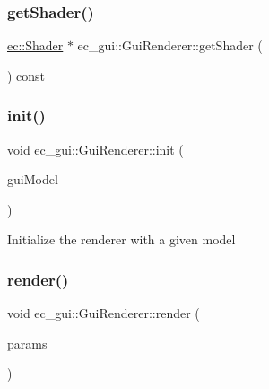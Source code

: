 \subsubsection{\texorpdfstring{get\+Shader()}{getShader()}}
{\footnotesize\ttfamily \mbox{\hyperlink{classec_1_1_shader}{ec\+::\+Shader}} $\ast$ ec\+\_\+gui\+::\+Gui\+Renderer\+::get\+Shader (\begin{DoxyParamCaption}{ }\end{DoxyParamCaption}) const}

\mbox{\label{classec__gui_1_1_gui_renderer_a35e7de4510fa8206976d894868710a99}} 
\subsubsection{\texorpdfstring{init()}{init()}}
{\footnotesize\ttfamily void ec\+\_\+gui\+::\+Gui\+Renderer\+::init (\begin{DoxyParamCaption}\item[{\mbox{\hyperlink{classec__gui_1_1_gui_model}{Gui\+Model}} $\ast$}]{gui\+Model }\end{DoxyParamCaption})}

Initialize the renderer with a given model \mbox{\label{classec__gui_1_1_gui_renderer_adf27a8072779fd7ce56315dd4db5ffd5}} 
\subsubsection{\texorpdfstring{render()}{render()}\hspace{0.1cm}{\footnotesize\ttfamily [1/5]}}
{\footnotesize\ttfamily void ec\+\_\+gui\+::\+Gui\+Renderer\+::render (\begin{DoxyParamCaption}\item[{\mbox{\hyperlink{structec__gui_1_1_gui_rendering_parameter_list}{Gui\+Rendering\+Parameter\+List}}}]{params }\end{DoxyParamCaption})}

\mbox{\label{classec__gui_1_1_gui_renderer_ac0242de734dc7f984221d3255eaf0f34}} 
